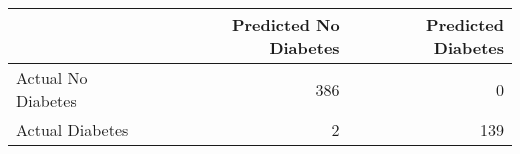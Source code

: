 \begin{tabular}{lrr}
\toprule
 & Predicted No Diabetes & Predicted Diabetes \\
\midrule
Actual No Diabetes & 386 & 0 \\
Actual Diabetes & 2 & 139 \\
\bottomrule
\end{tabular}
